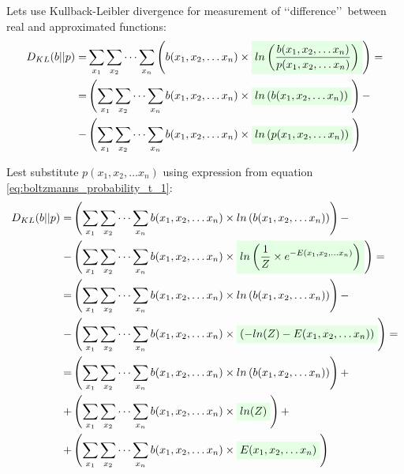 \documentclass[fleqn,leqno]{article}
\newcommand{\highlight}[1]{\colorbox{green!10}{$\displaystyle#1$}}
\begin{document}
Lets use Kullback-Leibler divergence for measurement of \lq \lq difference\rq \rq\ between real and approximated functions:
\begin{equation}
\begin{split}
D_{KL}(b||p) = & \sum_{x_1} \sum_{x_2} \cdots \sum_{x_n} \left( b(x_1, x_2, \dots x_n) \times \highlight{ ln \left( {b(x_1, x_2, \dots x_n) \over p(x_1, x_2, \dots x_n)} \right) } \right) = \\
            = & \left( \sum_{x_1} \sum_{x_2} \cdots \sum_{x_n} b(x_1, x_2, \dots x_n) \times \highlight{ ln \left( b(x_1, x_2, \dots x_n) \right) } \right) - \\
             - & \left( \sum_{x_1} \sum_{x_2} \cdots \sum_{x_n} b(x_1, x_2, \dots x_n) \times \highlight{ ln \left( p(x_1, x_2, \dots x_n) \right) } \right)
\end{split}
\end{equation}

Lest substitute $p(x_1, x_2, \dots x_n)$ using expression from equation \eqref{eq:boltzmanns_probability_t_1}:
\begin{equation}
\begin{split}
D_{KL}(b||p) = & \left( \sum_{x_1} \sum_{x_2} \cdots \sum_{x_n} b(x_1, x_2, \dots x_n) \times ln \left( b(x_1, x_2, \dots x_n) \right) \right) - \\
             - & \left( \sum_{x_1} \sum_{x_2} \cdots \sum_{x_n} b(x_1, x_2, \dots x_n) \times \highlight{ ln \left( {1 \over Z} \times e^{-E(x_1, x_2, \dots x_n)} \right) } \right) = \\
            = & \left( \sum_{x_1} \sum_{x_2} \cdots \sum_{x_n} b(x_1, x_2, \dots x_n) \times ln \left( b(x_1, x_2, \dots x_n) \right) \right) - \\
             - & \left( \sum_{x_1} \sum_{x_2} \cdots \sum_{x_n} b(x_1, x_2, \dots x_n) \times \highlight{ \left( -ln(Z) -E(x_1, x_2, \dots x_n) \right) } \right) = \\
            = & \left( \sum_{x_1} \sum_{x_2} \cdots \sum_{x_n} b(x_1, x_2, \dots x_n) \times ln \left( b(x_1, x_2, \dots x_n) \right) \right) + \\
            + & \left( \sum_{x_1} \sum_{x_2} \cdots \sum_{x_n} b(x_1, x_2, \dots x_n) \times \highlight{ ln(Z) } \right) + \\
             + & \left( \sum_{x_1} \sum_{x_2} \cdots \sum_{x_n} b(x_1, x_2, \dots x_n) \times \highlight{ E(x_1, x_2, \dots x_n) } \right) \\
\end{split}
\end{equation}
\end{document}

